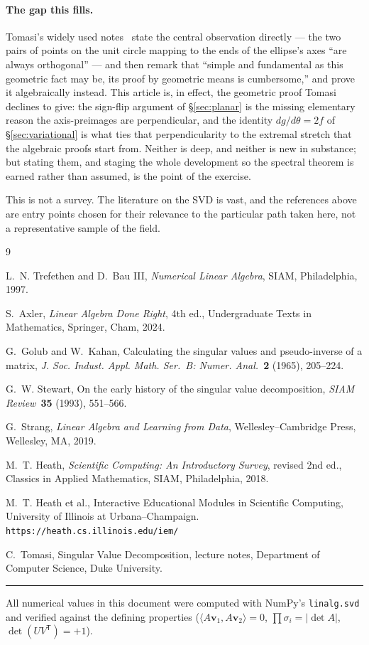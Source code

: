 \documentclass[11pt]{article}
\numberwithin{equation}{section}
\newcommand{\T}{^{\mathsf{T}}}
\newcommand{\ip}[2]{\langle #1, #2 \rangle}
\newcommand{\vv}[1]{\mathbf{v}_{#1}}
\theoremstyle{plainish}
\begin{document}
\paragraph{The gap this fills.} Tomasi's widely used
notes~\cite{tomasi} state the central observation directly --- the two pairs of
points on the unit circle mapping to the ends of the ellipse's axes ``are always
orthogonal'' --- and then remark that ``simple and fundamental as this geometric
fact may be, its proof by geometric means is cumbersome,'' and prove it
algebraically instead. This article is, in effect, the geometric proof Tomasi
declines to give: the sign-flip argument of \S\ref{sec:planar} is the missing
elementary reason the axis-preimages are perpendicular, and the identity
$dg/d\theta = 2f$ of \S\ref{sec:variational} is what ties that perpendicularity
to the extremal stretch that the algebraic proofs start from. Neither is deep,
and neither is new in substance; but stating them, and staging the whole
development so the spectral theorem is earned rather than assumed, is the point
of the exercise.

This is not a survey. The literature on the SVD is vast, and the references
above are entry points chosen for their relevance to the particular path taken
here, not a representative sample of the field.

\begin{thebibliography}{9}

L.~N. Trefethen and D.~Bau III,
\emph{Numerical Linear Algebra},
SIAM, Philadelphia, 1997.

S.~Axler,
\emph{Linear Algebra Done Right},
4th ed., Undergraduate Texts in Mathematics, Springer, Cham, 2024.

G.~Golub and W.~Kahan,
Calculating the singular values and pseudo-inverse of a matrix,
\emph{J. Soc. Indust. Appl. Math. Ser.~B: Numer. Anal.}~\textbf{2} (1965),
205--224.

G.~W. Stewart,
On the early history of the singular value decomposition,
\emph{SIAM Review}~\textbf{35} (1993), 551--566.

G.~Strang,
\emph{Linear Algebra and Learning from Data},
Wellesley--Cambridge Press, Wellesley, MA, 2019.

M.~T. Heath,
\emph{Scientific Computing: An Introductory Survey},
revised 2nd ed., Classics in Applied Mathematics, SIAM, Philadelphia, 2018.

M.~T. Heath et al.,
Interactive Educational Modules in Scientific Computing,
University of Illinois at Urbana--Champaign.
\texttt{https://heath.cs.illinois.edu/iem/}

C.~Tomasi,
Singular Value Decomposition,
lecture notes, Department of Computer Science, Duke University.

\end{thebibliography}

\bigskip
\hrule
\bigskip

\noindent
\footnotesize
All numerical values in this document were computed with NumPy's
\texttt{linalg.svd} and verified against the defining properties
($\ip{A\vv1}{A\vv2} = 0$, $\prod\sigma_i = |\det A|$, $\det(UV\T) = +1$).
\end{document}
